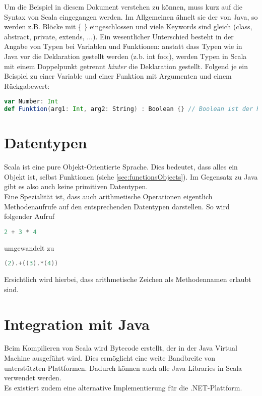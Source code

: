 Um die Beispiel in diesem Dokument verstehen zu können, muss kurz auf
die Syntax von Scala eingegangen werden. Im Allgemeinen ähnelt sie der
von Java, so werden z.B. Blöcke mit \{ \} eingeschlossen und viele
Keywords sind gleich (class, abstract, private, extends, ...).
Ein wesentlicher Unterschied besteht in der Angabe von Typen bei Variablen
und Funktionen: anstatt dass Typen wie in Java vor die Deklaration gestellt
werden (z.b. int foo;), werden Typen in Scala mit einem Doppelpunkt getrennt
\emph{hinter} die Deklaration gestellt. Folgend je ein Beispiel zu einer Variable
und einer Funktion mit Argumenten und einem Rückgabewert:

\begin{lstlisting}[float=ht,language=scala,caption=Typenangabe,label=lst:types]
var Number: Int
def Funktion(arg1: Int, arg2: String) : Boolean {} // Boolean ist der Rueckgabewert
\end{lstlisting}


\section{Datentypen}
\label{sec:datatypes}

Scala ist eine pure Objekt-Orientierte Sprache. Dies bedeutet, dass alles
ein Objekt ist, selbst Funktionen (siehe \ref{sec:functionsObjects}). Im
Gegensatz zu Java gibt es also auch keine primitiven Datentypen.\\

Eine Spezialität ist, dass auch arithmetische Operationen eigentlich
Methodenaufrufe auf den entsprechenden Datentypen darstellen. So wird
folgender Aufruf

\begin{lstlisting}[float=ht,language=scala,caption=Arithmetische Operationen,label=lst:arithmetic]
2 + 3 * 4
\end{lstlisting}

umgewandelt zu
\begin{lstlisting}[float=ht,language=scala,caption=Arithmetische Operationen konvertiert,label=lst:arithmeticConverted]
(2).+((3).*(4))
\end{lstlisting}

Ersichtlich wird hierbei, dass arithmetische Zeichen
als Methodennamen erlaubt sind. \\

\section{Integration mit Java}

Beim Kompilieren von Scala wird Bytecode erstellt, der in der Java
Virtual Machine ausgeführt wird. Dies ermöglicht eine weite Bandbreite
von unterstützten Plattformen. Dadurch können auch alle Java-Libraries
in Scala verwendet werden. \\

Es existiert zudem eine alternative Implementierung für die .NET-Plattform.
